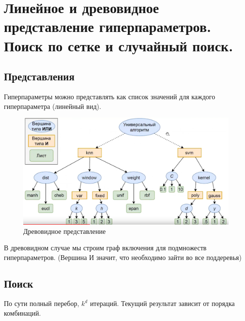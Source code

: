 \section{Линейное и древовидное представление гиперпараметров. Поиск по сетке и случайный поиск.}

\subsection{Представления}

Гиперпараметры можно представлять как список значений для
каждого гиперпараметра (линейный вид).

\begin{figure}[H]
    \centering
    \includegraphics[scale=.4]{images/hp_tree}
    \caption{Древовидное представление}
\end{figure}

В древовидном случае мы строим граф включения для подмножеств
гиперпараметров. (Вершина И значит, что необходимо зайти во все
поддеревья) 

\subsection{Поиск}


По сути полный перебор, $k^d$ итераций. Текущий результат зависит
от порядка комбинаций.

